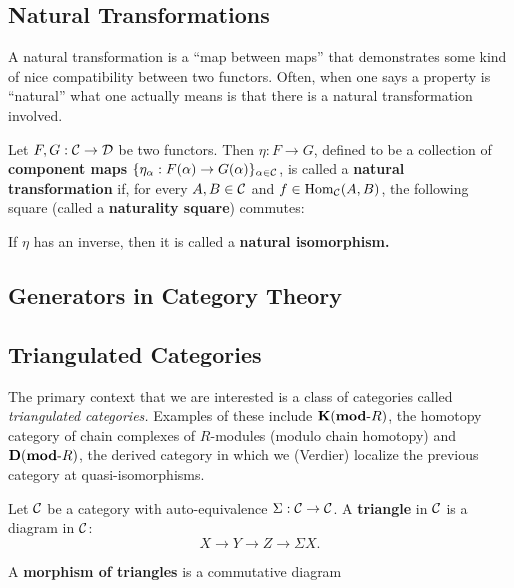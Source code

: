 \documentclass[12pt]{article}
\begin{document}
\subsection{Natural Transformations}
A natural transformation is a ``map between maps'' that demonstrates some kind of nice compatibility between two functors.
Often, when one says a property is ``natural'' what one actually means is that there is a natural transformation involved.

\begin{defn}
	Let $F,G:\mathcal{C}\to\mathcal{D}$ be two functors. Then $\eta:F\to G$, defined to be a collection of \textbf{component maps} $\{\eta_\alpha:F(\alpha)\to G(\alpha)\}_{\alpha\in\mathcal{C}}$, 
	is called a \textbf{natural transformation} if, for every 
	$A,B\in\mathcal{C}$ and $f\in\operatorname{Hom}_{\mathcal{C}}(A,B)$, the following square (called a \textbf{naturality square}) commutes:
	\begin{center}
	\end{center}
	If $\eta$ has an inverse, then it is called a \textbf{natural isomorphism.}
\end{defn}

\subsection{Generators in Category Theory}

\subsection{Triangulated Categories}
The primary context that we are interested is a class of categories called \textit{triangulated categories.} Examples of 
these include $\mathbf{K}(\mathbf{mod}\text{-}R)$, the homotopy category of chain complexes of $R$-modules (modulo chain homotopy) and $\mathbf{D}(\mathbf{mod}\text{-}R)$,
the derived category in which we (Verdier) localize the previous category at quasi-isomorphisms.
\begin{defn}
	Let $\mathcal{C}$ be a category with auto-equivalence $\Sigma:\mathcal{C}\to\mathcal{C}$. A \textbf{triangle} in $\mathcal{C}$ is a diagram in $\mathcal{C}$:
	\[X\to Y\to Z\to\Sigma X.\]
\end{defn}
\begin{defn}
	A \textbf{morphism of triangles} is a commutative diagram
	\begin{center}
	\end{center}
\end{defn}
\end{document}
